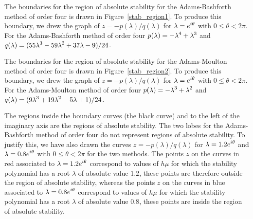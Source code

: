 
\begin{egg}
The boundaries for the region of absolute stability for the
Adams-Bashforth method of order four is drawn in
Figure~\ref{stab_region1}.
To produce this boundary, we drew the graph of
$z = - p(\lambda)/q(\lambda)$ for $\displaystyle \lambda = e^{i\theta}$ with
$0\leq \theta < 2\pi$.   For the Adams-Bashforth method
of order four $\displaystyle p(\lambda) = -\lambda^4 + \lambda^3$ and
$\displaystyle q(\lambda) = (55\lambda^3-59\lambda^2+37\lambda - 9)/24$.

The boundaries for the region of absolute stability for the
Adams-Moulton method of order four is drawn in
Figure~\ref{stab_region2}.  To produce this boundary, 
we drew the graph of $z = - p(\lambda)/q(\lambda)$ for
$\displaystyle \lambda = e^{i\theta}$ with $0\leq \theta < 2\pi$.
For the Adams-Moulton method of order four
$\displaystyle p(\lambda) = -\lambda^3 + \lambda^2$ and
$\displaystyle q(\lambda) = (9\lambda^3+19\lambda^2-5\lambda + 1)/24$.

The regions inside the boundary curves (the black curve) and to the
left of the imaginary axis are the regions of absolute stability.
The two lobes for the Adams-Bashforth method of order four do not
represent regions of absolute stability.  To justify this, we have
also drawn the curves $z = - p(\lambda)/q(\lambda)$ for
$\displaystyle \lambda = 1.2 e^{i\theta}$ and
$\displaystyle \lambda = 0.8 e^{i\theta}$ with
$0\leq \theta < 2\pi$ for the two methods.  The points $z$ on the
curves in red associated to $\displaystyle \lambda = 1.2 e^{i\theta}$ correspond
to values of $h\mu$ for which the stability polynomial has a root
$\lambda$ of absolute value $1.2$, these points are therefore outside
the region of absolute stability, whereas the points $z$ on the curves
in blue associated to $\displaystyle \lambda = 0.8 e^{i\theta}$ correspond to
values of $h\mu$ for which the stability polynomial has a root
$\lambda$ of absolute value $0.8$, these points are inside the region
of absolute stability.
\end{egg}


